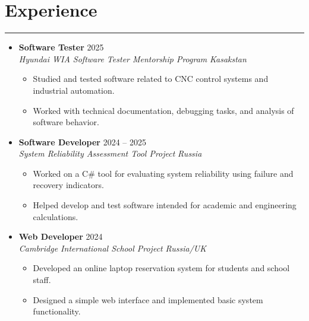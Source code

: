 \documentclass[letterpaper, 10pt]{article}
\begin{document}
\section*{Experience}
\hrule
\vspace{4pt}
\begin{itemize}
    \item[]
        \textbf{Software Tester} \hfill 2025 \\
        \textit{Hyundai WIA Software Tester Mentorship Program} \hfill \textit{Kasakstan}
        \begin{itemize}
            \item Studied and tested software related to CNC control systems and industrial automation.
            \item Worked with technical documentation, debugging tasks, and analysis of software behavior.
        \end{itemize}

    \item[]
        \textbf{Software Developer} \hfill 2024 -- 2025 \\
        \textit{System Reliability Assessment Tool Project} \hfill \textit{Russia}
        \begin{itemize}
            \item Worked on a C\# tool for evaluating system reliability using failure and recovery indicators.
            \item Helped develop and test software intended for academic and engineering calculations.
        \end{itemize}

    \item[]
        \textbf{Web Developer} \hfill 2024 \\
        \textit{Cambridge International School Project} \hfill \textit{Russia/UK}
        \begin{itemize}
            \item Developed an online laptop reservation system for students and school staff.
            \item Designed a simple web interface and implemented basic system functionality.
        \end{itemize}
\end{itemize}

\end{document}
